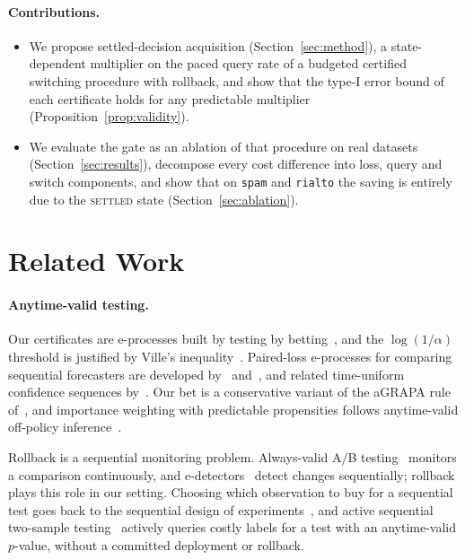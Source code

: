 \documentclass[10pt]{article}
\begin{document}
\paragraph{Contributions.}
\begin{itemize}
  \item We propose settled-decision acquisition (Section~\ref{sec:method}), a state-dependent
  multiplier on the paced query rate of a budgeted certified switching procedure with rollback,
  and show that the type-I error bound of each certificate holds for any predictable multiplier
  (Proposition~\ref{prop:validity}).
  \item We evaluate the gate as an ablation of that procedure on \NStreams{} real datasets
  (Section~\ref{sec:results}), decompose every cost difference into loss, query and switch
  components, and show that on \texttt{spam} and \texttt{rialto} the saving is entirely due to
  the \textsc{settled} state (Section~\ref{sec:ablation}).
\end{itemize}

\section{Related Work}\label{sec:related}
\paragraph{Anytime-valid testing.} Our certificates are e-processes built by testing by
betting~\citep{shafer2021testing,vovk2021evalues,ramdas2023gametheoretic}, and the
$\log(1/\alpha)$ threshold is justified by Ville's inequality~\citep{ville1939etude}. Paired-loss
e-processes for comparing sequential forecasters are developed by~\citet{choe2024comparing}
and~\citet{henzi2022valid}, and related time-uniform confidence sequences
by~\citet{howard2021timeuniform}. Our bet is a conservative variant of the aGRAPA rule
of~\citet{waudbysmith2024betting}, and importance weighting with predictable propensities follows
anytime-valid off-policy inference~\citep{waudbysmith2024anytime}.

Rollback is a sequential monitoring problem. Always-valid A/B testing~\citep{johari2022always}
monitors a comparison continuously, and e-detectors~\citep{shin2023edetectors} detect changes
sequentially; rollback plays this role in our setting. Choosing which observation to buy for a
sequential test goes back to the sequential design of experiments~\citep{chernoff1959sequential},
and active sequential two-sample testing~\citep{li2023active} actively queries costly labels for
a test with an anytime-valid $p$-value, without a committed deployment or rollback.
\end{document}
